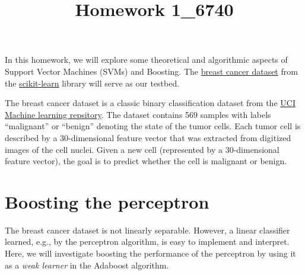 \documentclass[12pt]{article}
\title{Homework 1_6740}
\begin{document}
\MakeScribeTop

In this homework, we will explore some theoretical and algorithmic aspects of Support Vector Machines (SVMs) and Boosting. The  \href{https://scikit-learn.org/stable/modules/generated/sklearn.datasets.load_breast_cancer.html}{breast cancer dataset} from the \href{https://scikit-learn.org/stable/modules/generated/sklearn.datasets.load_breast_cancer.html}{scikit-learn} library will serve as our testbed.

The breast cancer dataset is a classic binary classification dataset from the \href{https://archive.ics.uci.edu/dataset/17/breast+cancer+wisconsin+diagnostic}{UCI Machine learning repsitory}. The dataset contains 569 samples with labels ``malignant'' or ``benign'' denoting the state of the tumor cells. Each tumor cell is described by a 30-dimensional feature vector that was extracted from digitized images of the cell nuclei. Given a new cell (represented by a 30-dimensional feature vector), the goal is to predict whether the cell is malignant or benign.


\section{Boosting the perceptron}
The breast cancer dataset is not linearly separable. However, a linear classifier learned, e.g., by the perceptron algorithm, is easy to implement and interpret. Here, we will investigate boosting the performance of the perceptron by using it as a \emph{weak learner} in the Adaboost algorithm.
\end{document}
